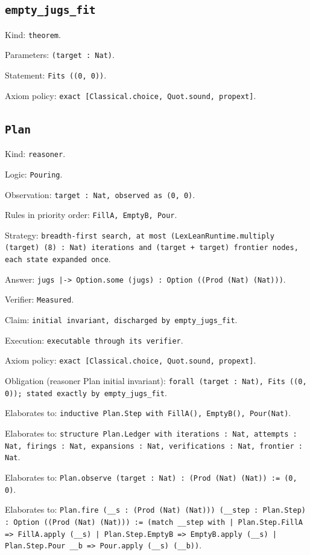 \documentclass[11pt]{article}
\begin{document}
\subsection*{\texttt{empty\_jugs\_fit}}
\noindent Kind: \texttt{theorem}.\par
\noindent Parameters: \texttt{(target : Nat)}.\par
\noindent Statement: \texttt{Fits ((0, 0))}.\par
\noindent Axiom policy: \texttt{exact [Classical.choice, Quot.sound, propext]}.\par
\subsection*{\texttt{Plan}}
\noindent Kind: \texttt{reasoner}.\par
\noindent Logic: \texttt{Pouring}.\par
\noindent Observation: \texttt{target : Nat, observed as (0, 0)}.\par
\noindent Rules in priority order: \texttt{FillA, EmptyB, Pour}.\par
\noindent Strategy: \texttt{breadth-first search, at most (LexLeanRuntime.multiply (target) (8) : Nat) iterations and (target + target) frontier nodes, each state expanded once}.\par
\noindent Answer: \texttt{jugs |-> Option.some (jugs) : Option ((Prod (Nat) (Nat)))}.\par
\noindent Verifier: \texttt{Measured}.\par
\noindent Claim: \texttt{initial invariant, discharged by empty\_jugs\_fit}.\par
\noindent Execution: \texttt{executable through its verifier}.\par
\noindent Axiom policy: \texttt{exact [Classical.choice, Quot.sound, propext]}.\par
\noindent Obligation (reasoner Plan initial invariant): \texttt{forall (target : Nat), Fits ((0, 0)); stated exactly by empty\_jugs\_fit}.\par
\noindent Elaborates to: \texttt{inductive Plan.Step with FillA(), EmptyB(), Pour(Nat)}.\par
\noindent Elaborates to: \texttt{structure Plan.Ledger with iterations : Nat, attempts : Nat, firings : Nat, expansions : Nat, verifications : Nat, frontier : Nat}.\par
\noindent Elaborates to: \texttt{Plan.observe (target : Nat) : (Prod (Nat) (Nat)) := (0, 0)}.\par
\noindent Elaborates to: \texttt{Plan.fire (\_\_s : (Prod (Nat) (Nat))) (\_\_step : Plan.Step) : Option ((Prod (Nat) (Nat))) := (match \_\_step with | Plan.Step.FillA => FillA.apply (\_\_s) | Plan.Step.EmptyB => EmptyB.apply (\_\_s) | Plan.Step.Pour \_\_b => Pour.apply (\_\_s) (\_\_b))}.\par
\end{document}
